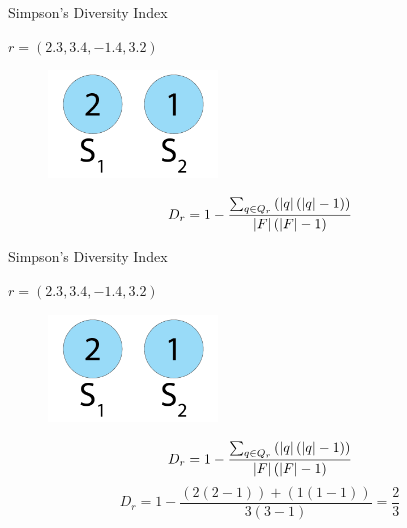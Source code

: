 \begin{frame}{Simpson's Diversity Index}
\begin{center}
$r = (2.3, 3.4, -1.4, 3.2)$
  \begin{figure}[p]
  \includegraphics[width=0.4\textwidth]{images/speciessize.png}
  \end{figure}
\begin{equation}
D_r = 1 - \frac{\sum_{q \in Q_{r}}\left(\lvert q\rvert\left(\lvert q\rvert - 1\right)\right)}{\lvert F\rvert\left(\lvert F\rvert - 1\right)}
\end{equation}
\end{center}
\end{frame}

\begin{frame}{Simpson's Diversity Index}
\begin{center}
$r = (2.3, 3.4, -1.4, 3.2)$
  \begin{figure}[p]
  \includegraphics[width=0.4\textwidth]{images/speciessize.png}
  \end{figure}
\begin{equation}
D_r = 1 - \frac{\sum_{q \in Q_{r}}\left(\lvert q\rvert\left(\lvert q\rvert - 1\right)\right)}{\lvert F\rvert\left(\lvert F\rvert - 1\right)}
\end{equation}
\begin{equation}\label{eq:nntd}
D_r = 1 - \frac{(2(2-1))+(1(1-1))}{3(3-1)} = \frac{2}{3}
\end{equation}
\end{center}
\end{frame}

